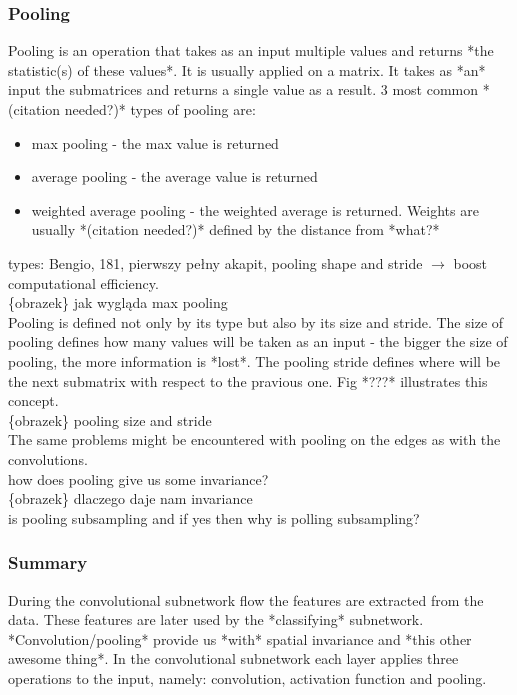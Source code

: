 \documentclass[a4paper,10pt]{report}
\begin{document}
	\subsubsection{Pooling} %
	  Pooling is an operation that takes as an input multiple values and returns *the statistic(s) of these values*. It is usually applied on a matrix. It takes as *an* input the submatrices and returns a single value as a result. 3 most common *(citation needed?)* types of pooling are:
	  \begin{itemize}
	   \item max pooling - the max value is returned
	   \item average pooling - the average value is returned
	   \item weighted average pooling - the weighted average is returned. Weights are usually *(citation needed?)* defined by the distance from *what?*
	  \end{itemize}
	  
	  types: Bengio, 181, pierwszy pełny akapit, pooling shape and stride $\rightarrow$ boost computational efficiency. \\

	  \{obrazek\} jak wygląda max pooling \\
	  
	  Pooling is defined not only by its type but also by its size and stride. The size of pooling defines how many values will be taken as an input - the bigger the size of pooling, the more information is *lost*. The pooling stride defines where will be the next submatrix with respect to the pravious one. Fig *???* illustrates this concept. \\
	  
	  \{obrazek\} pooling size and stride \\
	  
	  The same problems might be encountered with pooling on the edges as with the convolutions. \\ %
	  
	  how does pooling give us some invariance? \\ 
	  
	  \{obrazek\} dlaczego daje nam invariance\\
	  
	  is pooling subsampling and if yes then why is polling subsampling? \\ 
	
	\subsubsection{Summary} %
	  During the convolutional subnetwork flow the features are extracted from the data. These features are later used by the *classifying* subnetwork. *Convolution/pooling* provide us *with* spatial invariance and *this other awesome thing*. In the convolutional subnetwork each layer applies three operations to the input, namely: convolution, activation function and pooling. \\ %
	  
\end{document}
